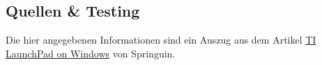 









\subsection{Quellen \& Testing}
Die hier angegebenen Informationen sind ein Auszug aus dem Artikel
\href{http://springuin.nl/articles/launchpadwindows}{TI LaunchPad on Windows} von 
Springuin. 

